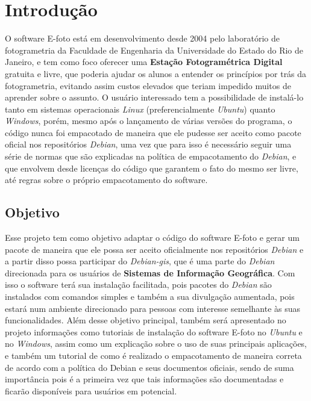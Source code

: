 \chapter*{Introdução}

O software E-foto está em desenvolvimento desde 2004 pelo laboratório de fotogrametria da Faculdade de Engenharia da Universidade do Estado do Rio de Janeiro, e tem como foco oferecer uma \textbf{Estação Fotogramétrica Digital} gratuita e livre, que poderia ajudar os alunos a entender os princípios por trás da fotogrametria, evitando assim custos elevados que teriam impedido muitos de aprender sobre o assunto. O usuário interessado tem a possibilidade de instalá-lo tanto em sistemas operacionais \textit{Linux} (preferencialmente \textit{Ubuntu}) quanto \textit{Windows}, porém, mesmo após o lançamento de várias versões do programa, o código nunca foi empacotado de maneira que ele pudesse ser aceito como pacote oficial nos repositórios \textit{Debian}, uma vez que para isso é necessário seguir uma série de normas que são explicadas na política de empacotamento do \textit{Debian}, e que envolvem desde licenças do código que garantem o fato do mesmo ser livre, até regras sobre o próprio empacotamento do software.

\section*{Objetivo}

Esse projeto tem como objetivo adaptar o código do software E-foto e gerar um pacote  de maneira que ele possa ser aceito oficialmente nos repositórios \textit{Debian} e a partir disso possa participar do \textit{Debian-gis}, que é uma parte do \textit{Debian} direcionada para os usuários de \textbf{Sistemas de Informação Geográfica}. Com isso o software terá sua instalação facilitada, pois pacotes do \textit{Debian} são instalados com comandos simples e também a sua divulgação aumentada, pois estará num ambiente direcionado para pessoas com interesse semelhante às suas funcionalidades. Além desse objetivo principal, também será apresentado no projeto informações como tutoriais de instalação do software E-foto no \textit{Ubuntu} e no \textit{Windows}, assim como um explicação sobre o uso de suas principais aplicações, e também um tutorial de como é realizado o empacotamento de maneira correta de acordo com a política do Debian e seus documentos oficiais, sendo de suma importância pois é a primeira vez que tais informações são documentadas e ficarão disponíveis para usuários em potencial.

